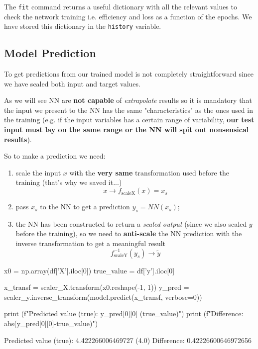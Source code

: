 The \texttt{fit} command returns a useful dictionary with all the relevant values to check the network training i.e. efficiency and loss as a function of the epochs. We have stored this dictionary in the \texttt{history} variable.

\subsection{Model Prediction}

To get predictions from our trained model is not completely straightforward since we have scaled both input and target values.

As we will see NN are \textbf{not capable} of \textit{extrapolate} results so it is mandatory that the input we present to the NN has the same "characteristics" as the ones used in the training (e.g. if the input variables has a certain range of variability, \textbf{our test input must lay on the same range or the NN will spit out nonsensical results}).

So to make a prediction we need:
\begin{enumerate}
\item scale the input $x$ with the \textbf{very same} transformation used before the training (that's why we saved it...)
\begin{equation*}
x \rightarrow f_{\text{scaleX}}(x) = x_s
\end{equation*}
\item pass $x_s$ to the NN to get a prediction $y_s = NN(x_s)$;
\item the NN has been constructed to return a \textit{scaled output} (since we also scaled $y$ before the training), so we need to \textbf{anti-scale} the NN prediction with the inverse transformation to get a meaningful result
\begin{equation*}
f^{-1}_{\text{scaleY}}(y_s) \rightarrow \tilde{y}
\end{equation*}
\end{enumerate}

\begin{ipythonnon}
x0 = np.array(df['X'].iloc[0])
true_value = df['y'].iloc[0]

x_transf = scaler_X.transform(x0.reshape(-1, 1))
y_pred = scaler_y.inverse_transform(model.predict(x_transf, verbose=0))

print (f"Predicted value (true): {y_pred[0][0]} ({true_value})")
print (f"Difference: {abs(y_pred[0][0]-true_value)}")
\end{ipythonnon}
\begin{ioutput}
Predicted value (true): 4.422266006469727 (4.0)
Difference: 0.42226600646972656
\end{ioutput}

